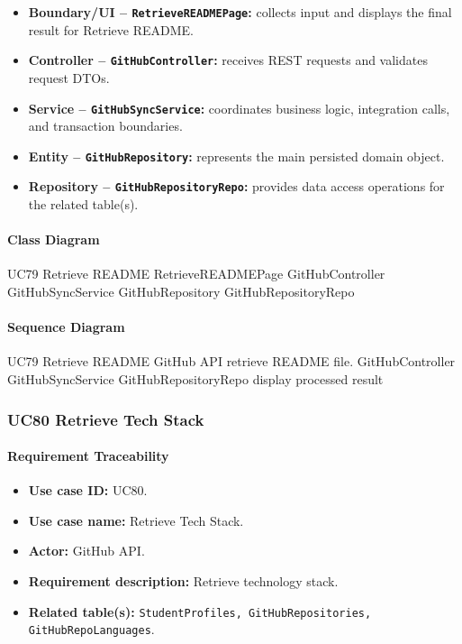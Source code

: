 \begin{itemize}
    \item \textbf{Boundary/UI -- \texttt{RetrieveREADMEPage}:} collects input and displays the final result for Retrieve README.
    \item \textbf{Controller -- \texttt{GitHubController}:} receives REST requests and validates request DTOs.
    \item \textbf{Service -- \texttt{GitHubSyncService}:} coordinates business logic, integration calls, and transaction boundaries.
    \item \textbf{Entity -- \texttt{GitHubRepository}:} represents the main persisted domain object.
    \item \textbf{Repository -- \texttt{GitHubRepositoryRepo}:} provides data access operations for the related table(s).
\end{itemize}

\paragraph{Class Diagram}

\ClassDiagram
{UC79 Retrieve README}
{RetrieveREADMEPage}
{GitHubController}
{GitHubSyncService}
{GitHubRepository}
{GitHubRepositoryRepo}

\paragraph{Sequence Diagram}

\SequenceDiagram
{UC79 Retrieve README}
{GitHub API}
{retrieve README file.}
{GitHubController}
{GitHubSyncService}
{GitHubRepositoryRepo}
{display processed result}

\subsubsection{UC80 Retrieve Tech Stack}

\paragraph{Requirement Traceability}

\begin{itemize}
    \item \textbf{Use case ID:} UC80.
    \item \textbf{Use case name:} Retrieve Tech Stack.
    \item \textbf{Actor:} GitHub API.
    \item \textbf{Requirement description:} Retrieve technology stack.
    \item \textbf{Related table(s):} \texttt{StudentProfiles, GitHubRepositories, GitHubRepoLanguages}.
\end{itemize}

